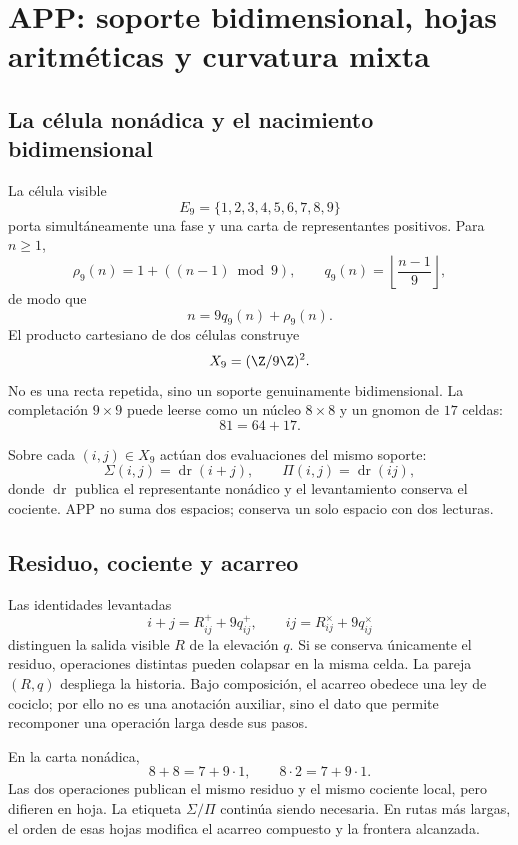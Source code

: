\chapter{APP: soporte bidimensional, hojas aritméticas y curvatura mixta}

\section{La célula nonádica y el nacimiento bidimensional}

La célula visible
\[
 E_9=\{1,2,3,4,5,6,7,8,9\}
\]
porta simultáneamente una fase y una carta de representantes positivos. Para
\(n\ge1\),
\[
 \rho_9(n)=1+((n-1)\bmod9),\qquad
 q_9(n)=\left\lfloor\frac{n-1}{9}\right\rfloor,
\]
de modo que
\[
 n=9q_9(n)+\rho_9(n).
\]
El producto cartesiano de dos células construye
\[
 X_9=(\Z/9\Z)^2.
\]
No es una recta repetida, sino un soporte genuinamente bidimensional. La
completación \(9\times9\) puede leerse como un núcleo \(8\times8\) y un
gnomon de \(17\) celdas:
\[
81=64+17.
\]

Sobre cada \((i,j)\in X_9\) actúan dos evaluaciones del mismo soporte:
\[
 \Sigma(i,j)=\operatorname{dr}(i+j),\qquad
 \Pi(i,j)=\operatorname{dr}(ij),
\]
donde \(\operatorname{dr}\) publica el representante nonádico y el
levantamiento conserva el cociente. APP no suma dos espacios; conserva un
solo espacio con dos lecturas.

\section{Residuo, cociente y acarreo}

Las identidades levantadas
\[
 i+j=R^+_{ij}+9q^+_{ij},\qquad
 ij=R^\times_{ij}+9q^\times_{ij}
\]
distinguen la salida visible \(R\) de la elevación \(q\). Si se conserva
únicamente el residuo, operaciones distintas pueden colapsar en la misma
celda. La pareja \((R,q)\) despliega la historia. Bajo composición, el
acarreo obedece una ley de cociclo; por ello no es una anotación auxiliar,
sino el dato que permite recomponer una operación larga desde sus pasos.

\begin{example}
En la carta nonádica,
\[
 8+8=7+9\cdot1,\qquad 8\cdot2=7+9\cdot1.
\]
Las dos operaciones publican el mismo residuo y el mismo cociente local,
pero difieren en hoja. La etiqueta \(\Sigma/\Pi\) continúa siendo necesaria.
En rutas más largas, el orden de esas hojas modifica el acarreo compuesto y
la frontera alcanzada.
\end{example}

